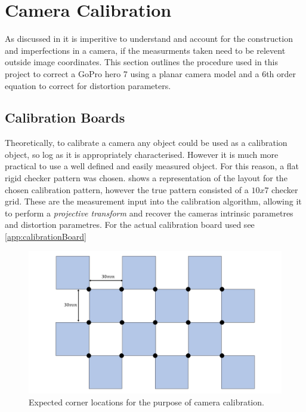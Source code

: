 \documentclass{UoNMCHA}
\numberwithin{equation}{section}
\begin{document}
\newpage
\section{Camera Calibration}
As discussed in  it is imperitive to understand and account for the construction and imperfections in a camera, if the measurments taken need to be relevent outside image coordinates. This section outlines the procedure used in this project to correct a GoPro hero 7 using a planar camera model and a 6th order equation to correct for distortion parameters.

\subsection{Calibration Boards}\label{sec:CalibrationBoards}
Theoretically, to calibrate a camera any object could be used as a calibration object, so log as it is appropriately characterised. However it is much more practical to use a well defined and easily measured object. For this reason, a flat rigid checker pattern was chosen.  shows a representation of the layout for the chosen calibration pattern, however the true pattern consisted of a $10 x 7$ checker grid. These are the measurement input into the calibration algorithm, allowing it to perform a \textit{projective transform} and recover the cameras intrinsic parametres and distortion parametres. For the actual calibration board used see \cref{app:calibrationBoard}

\begin{figure}[ht]
    \begin{center}
        \includegraphics[width=.8\linewidth]{Figures/CalibCornerLocations}
        \caption{Expected corner locations for the purpose of camera calibration.}
        \label{fig:cornerLocations}
    \end{center}
\end{figure}
\end{document}
